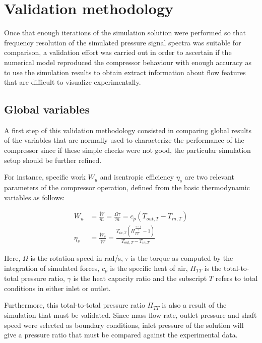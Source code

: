 \section{Validation methodology}

Once that enough iterations of the simulation solution were performed so that frequency resolution of the simulated pressure signal spectra was suitable for comparison, a validation effort was carried out in order to ascertain if the numerical model reproduced the compressor behaviour with enough accuracy as to use the simulation results to obtain extract information about flow features that are difficult to visualize experimentally.   

\subsection{Global variables}

A first step of this validation methodology consisted in comparing global results of the variables that are normally used to characterize the performance of the compressor since if these simple checks were not good, the particular simulation setup should be  further refined.

For instance, specific work $W_u$ and isentropic efficiency $\eta_s$ are two relevant parameters of the compressor operation, defined from the basic thermodynamic variables as follows:

\begin{align}\label{eq:powerAndEfficiency}
W_u&=\frac{\dot{W}}{\dot{m}}=\frac{\Omega\tau}{\dot{m}}=c_p(T_{out,T}-T_{in,T}) \nonumber \\
\eta_s &= \frac{\dot{W}_{s}}{\dot{W}}=\frac{T_{in,T}\left(\varPi_{TT}^\frac{\gamma-1}{\gamma}-1\right)}{T_{out,T}-T_{in,T}}
\end{align}

Here, $\Omega$ is the rotation speed in rad/s, $\tau$ is the torque as computed by the integration of simulated forces, $c_p$ is the specific heat of air, $\varPi_{TT}$ is the total-to-total pressure ratio, $\gamma$ is the heat capacity ratio and the subscript $T$ refers to total conditions in either inlet or outlet.

Furthermore, this total-to-total pressure ratio $\varPi_{TT}$ is also a result of the simulation that must be validated. Since mass flow rate, outlet pressure and shaft speed were selected as boundary conditions, inlet pressure of the solution will give a pressure ratio that must be compared against the experimental data. 


